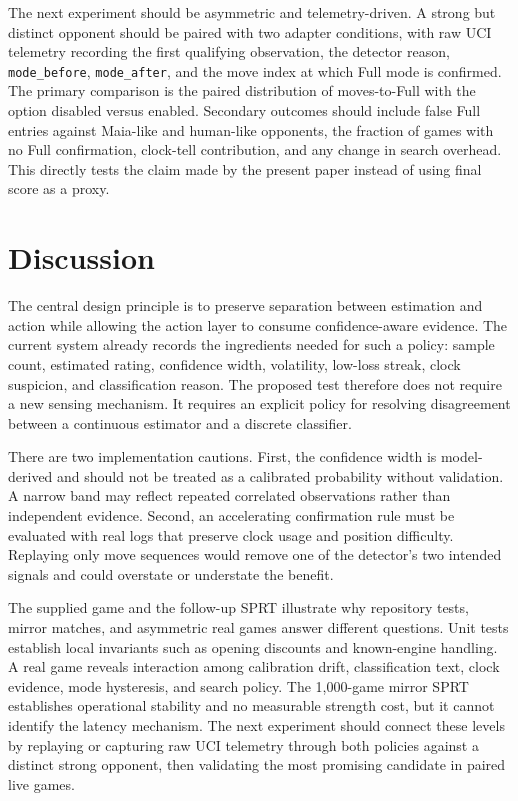 \documentclass[conference]{IEEEtran}
\begin{document}
The next experiment should be asymmetric and telemetry-driven. A strong but distinct opponent should be paired with two adapter conditions, with raw UCI telemetry recording the first qualifying observation, the detector reason, \texttt{mode\_before}, \texttt{mode\_after}, and the move index at which Full mode is confirmed. The primary comparison is the paired distribution of moves-to-Full with the option disabled versus enabled. Secondary outcomes should include false Full entries against Maia-like and human-like opponents, the fraction of games with no Full confirmation, clock-tell contribution, and any change in search overhead. This directly tests the claim made by the present paper instead of using final score as a proxy.

\section{Discussion}
The central design principle is to preserve separation between estimation and action while allowing the action layer to consume confidence-aware evidence. The current system already records the ingredients needed for such a policy: sample count, estimated rating, confidence width, volatility, low-loss streak, clock suspicion, and classification reason. The proposed test therefore does not require a new sensing mechanism. It requires an explicit policy for resolving disagreement between a continuous estimator and a discrete classifier.

There are two implementation cautions. First, the confidence width is model-derived and should not be treated as a calibrated probability without validation. A narrow band may reflect repeated correlated observations rather than independent evidence. Second, an accelerating confirmation rule must be evaluated with real logs that preserve clock usage and position difficulty. Replaying only move sequences would remove one of the detector's two intended signals and could overstate or understate the benefit.

The supplied game and the follow-up SPRT illustrate why repository tests, mirror matches, and asymmetric real games answer different questions. Unit tests establish local invariants such as opening discounts and known-engine handling. A real game reveals interaction among calibration drift, classification text, clock evidence, mode hysteresis, and search policy. The 1,000-game mirror SPRT establishes operational stability and no measurable strength cost, but it cannot identify the latency mechanism. The next experiment should connect these levels by replaying or capturing raw UCI telemetry through both policies against a distinct strong opponent, then validating the most promising candidate in paired live games.
\end{document}
